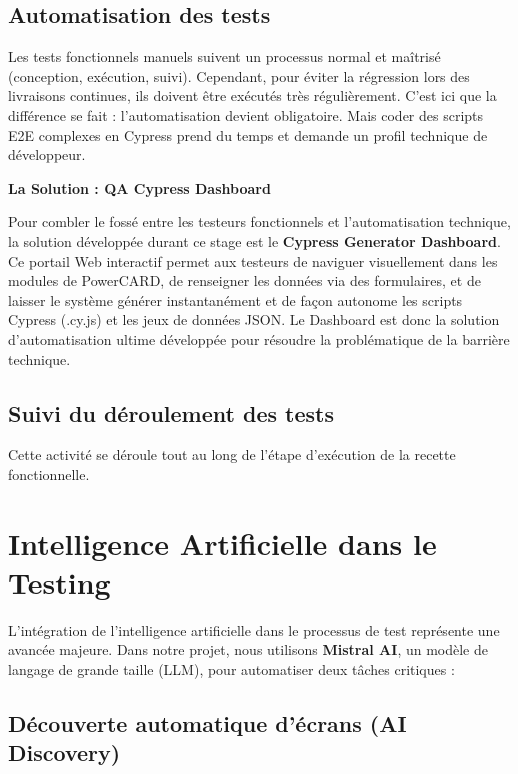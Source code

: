 \subsection{Automatisation des tests}

Les tests fonctionnels manuels suivent un processus normal et maîtrisé (conception, exécution, suivi). Cependant, pour éviter la régression lors des livraisons continues, ils doivent être exécutés très régulièrement. C'est ici que la différence se fait : l'automatisation devient obligatoire. Mais coder des scripts E2E complexes en Cypress prend du temps et demande un profil technique de développeur.

\textbf{La Solution : QA Cypress Dashboard}

Pour combler le fossé entre les testeurs fonctionnels et l'automatisation technique, la solution développée durant ce stage est le \textbf{Cypress Generator Dashboard}. Ce portail Web interactif permet aux testeurs de naviguer visuellement dans les modules de PowerCARD, de renseigner les données via des formulaires, et de laisser le système générer instantanément et de façon autonome les scripts Cypress (.cy.js) et les jeux de données JSON. Le Dashboard est donc la solution d'automatisation ultime développée pour résoudre la problématique de la barrière technique.

\subsection{Suivi du déroulement des tests}

Cette activité se déroule tout au long de l'étape d'exécution de la recette fonctionnelle.

\section{Intelligence Artificielle dans le Testing}

L'intégration de l'intelligence artificielle dans le processus de test représente une avancée majeure. Dans notre projet, nous utilisons \textbf{Mistral AI}, un modèle de langage de grande taille (LLM), pour automatiser deux tâches critiques :

\subsection{Découverte automatique d'écrans (AI Discovery)}

